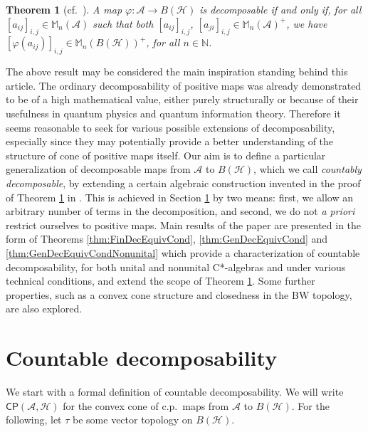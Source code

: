 \documentclass[reqno]{amsart}
\newtheorem{theorem}{Theorem}
\theoremstyle{plain}
\numberwithin{equation}{section}
\numberwithin{theorem}{section}
\numberwithin{lemma}{section}
\numberwithin{definition}{section}
\numberwithin{corollary}{section}
\numberwithin{remark}{section}
\newcommand{\naturals}{\mathbb{N}}
\newcommand{\hilbert}{\mathcal{H}}
\newcommand{\matra}[2]{\mathbb{M}_{#1}(#2)}
\newcommand{\cp}[2]{\mathsf{CP}(#1,#2)}
\begin{document}
\begin{theorem}[cf.~\cite{Stormer_1982}]\label{thm:StormerDecEquiv}
    A map $\varphi : \mathscr{A}\to B(\hilbert)$ is decomposable if and only if, for all $\left[a_{ij}\right]_{i,j}\in \matra{n}{\mathscr{A}}$ such that both $\left[a_{ij}\right]_{i,j}$, $\left[a_{ji}\right]_{i,j}\in\matra{n}{\mathscr{A}}^+$, we have $\left[\varphi(a_{ij})\right]_{i,j}\in\matra{n}{B(\hilbert)}^+$, for all $n\in\naturals$.
\end{theorem}

The above result may be considered the main inspiration standing behind this article. The ordinary decomposability of positive maps was already demonstrated to be of a high mathematical value, either purely structurally or because of their usefulness in quantum physics and quantum information theory. Therefore it seems reasonable to seek for various possible extensions of decomposability, especially since they may potentially provide a better understanding of the structure of cone of positive maps itself. Our aim is to define a particular generalization of decomposable maps from $\mathscr{A}$ to $B(\hilbert)$, which we call \emph{countably decomposable}, by extending a certain algebraic construction invented in the proof of Theorem \ref{thm:StormerDecEquiv} in \cite{Stormer_1982}. This is achieved in Section \ref{sec:GDM} by two means: first, we allow an arbitrary number of terms in the decomposition, and second, we do not \emph{a priori} restrict ourselves to positive maps. Main results of the paper are presented in the form of Theorems \ref{thm:FinDecEquivCond}, \ref{thm:GenDecEquivCond} and \ref{thm:GenDecEquivCondNonunital} which provide a characterization of countable decomposability, for both unital and nonunital C*-algebras and under various technical conditions, and extend the scope of Theorem \ref{thm:StormerDecEquiv}. Some further properties, such as a convex cone structure and closedness in the BW topology, are also explored.

\section{Countable decomposability}
\label{sec:GDM}

We start with a formal definition of countable decomposability. We will write $\cp{\mathscr{A}}{\hilbert}$ for the convex cone of c.p.~maps from $\mathscr{A}$ to $B(\hilbert)$. For the following, let $\tau$ be some vector topology on $B(\hilbert)$.
\end{document}
